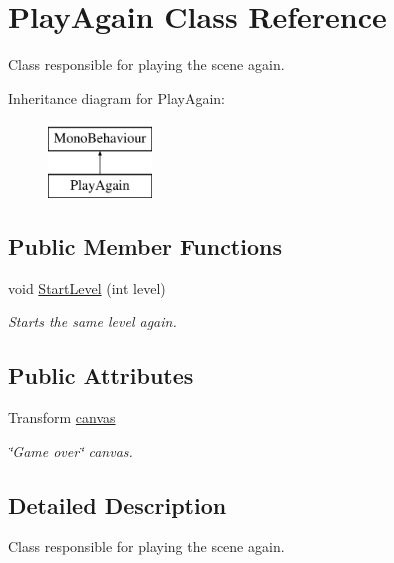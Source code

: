 \hypertarget{class_play_again}{}\section{Play\+Again Class Reference}
\label{class_play_again}


Class responsible for playing the scene again.  


Inheritance diagram for Play\+Again\+:\begin{figure}[H]
\begin{center}
\leavevmode
\includegraphics[height=2.000000cm]{class_play_again}
\end{center}
\end{figure}
\subsection*{Public Member Functions}
\begin{DoxyCompactItemize}
\item 
void \mbox{\hyperlink{class_play_again_af43857b80384f4ef6ef3bda6e8ac525c}{Start\+Level}} (int level)
\begin{DoxyCompactList}\small\item\em Starts the same level again. \end{DoxyCompactList}\end{DoxyCompactItemize}
\subsection*{Public Attributes}
\begin{DoxyCompactItemize}
\item 
Transform \mbox{\hyperlink{class_play_again_ad48a4dfa626a86c3b686a6c66537612e}{canvas}}
\begin{DoxyCompactList}\small\item\em \char`\"{}\+Game over\char`\"{} canvas. \end{DoxyCompactList}\end{DoxyCompactItemize}


\subsection{Detailed Description}
Class responsible for playing the scene again. 



